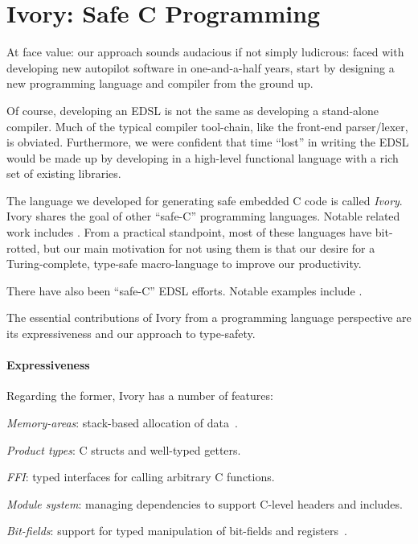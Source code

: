 \section{Ivory: Safe C Programming}

At face value: our approach sounds audacious if not simply ludicrous: faced with
developing new autopilot software in one-and-a-half years, start by designing a
new programming language and compiler from the ground up.

Of course, developing an EDSL is not the same as developing a stand-alone
compiler.  Much of the typical compiler tool-chain, like the front-end
parser/lexer, is obviated.  Furthermore, we were confident that time ``lost'' in
writing the EDSL would be made up by developing in a high-level functional
language with a rich set of existing libraries.

The language we developed for generating safe embedded C code is called
\emph{Ivory}.  Ivory shares the goal of other ``safe-C'' programming languages.
Notable related work includes .  From a
practical standpoint, most of these languages have bit-rotted, but our main
motivation for not using them is that our desire for a Turing-complete,
type-safe macro-language to improve our productivity.

There have also been ``safe-C'' EDSL efforts.  Notable examples include
.  

The essential contributions of Ivory from a programming language perspective are
its expressiveness and our approach to type-safety.

\paragraph{Expressiveness}
Regarding the former, Ivory has a number of features:

\begin{compactitem}
  \item \emph{Memory-areas}: stack-based allocation of data~\cite{}.
  \item \emph{Product types}: C structs and well-typed getters.
  \item \emph{FFI}: typed interfaces for calling arbitrary C functions.
  \item \emph{Module system}: managing dependencies to support C-level headers and
    includes.
  \item \emph{Bit-fields}: support for typed manipulation of bit-fields and registers~\cite{}.
\end{compactitem}

